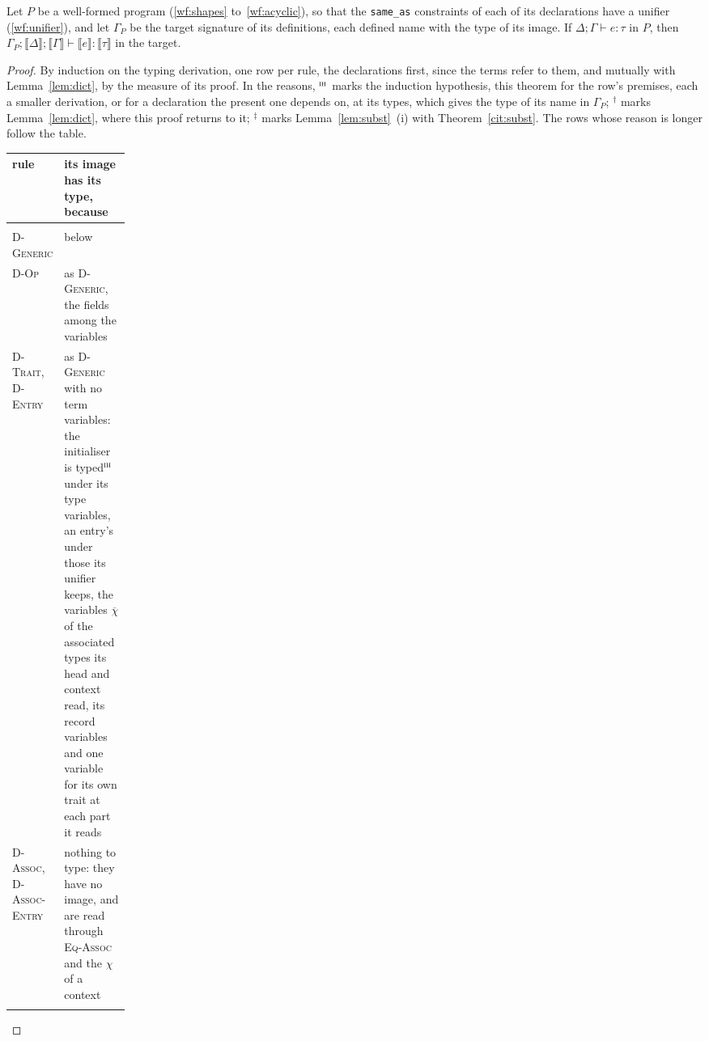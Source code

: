 \begin{theorem}
\label{thm:preservation}
Let $P$ be a well-formed program (\ref{wf:shapes} to~\ref{wf:acyclic}), so that the \texttt{same\_as} constraints of each of its declarations have a unifier (\ref{wf:unifier}), and let $\Gamma_P$ be the target signature of its definitions, each defined name with the type of its image.
If $\Delta; \Gamma \vdash e : \tau$ in $P$, then $\Gamma_P; \llbracket \Delta \rrbracket; \llbracket \Gamma \rrbracket \vdash \llbracket e \rrbracket : \llbracket \tau \rrbracket$ in the target.
\end{theorem}
\begin{proof}
By induction on the typing derivation, one row per rule, the declarations first, since the terms refer to them, and mutually with Lemma~\ref{lem:dict}, by the measure of its proof.
In the reasons, ${}^{\textsc{ih}}$ marks the induction hypothesis, this theorem for the row's premises, each a smaller derivation, or for a declaration the present one depends on, at its types, which gives the type of its name in $\Gamma_P$; ${}^{\dagger}$ marks Lemma~\ref{lem:dict}, where this proof returns to it; ${}^{\ddagger}$ marks Lemma~\ref{lem:subst}~(i) with Theorem~\ref{cit:subst}.
The rows whose reason is longer follow the table.
\begingroup
\small
\begin{longtable}{@{}>{\raggedright\arraybackslash}p{0.17\linewidth}>{\raggedright\arraybackslash}p{}@{}}
\toprule
rule & its image has its type, because \\
\midrule
\endhead
\bottomrule
\endlastfoot
\multicolumn{2}{@{}l}{\textit{declarations, Figures~\ref{fig:fjlt-assoc} and~\ref{fig:fjlt-declarations}}} \\
\textsc{D-Generic} & below \\
\textsc{D-Op} & as \textsc{D-Generic}, the fields among the variables \\
\textsc{D-Trait}, \textsc{D-Entry} & as \textsc{D-Generic} with no term variables: the initialiser is typed${}^{\textsc{ih}}$ under its type variables, an entry's under those its unifier keeps, the variables $\overline{\chi}$ of the associated types its head and context read, its record variables and one variable for its own trait at each part it reads \\
\textsc{D-Assoc}, \textsc{D-Assoc-Entry} & nothing to type: they have no image, and are read through \textsc{Eq-Assoc} and the $\chi$ of a context \\
\multicolumn{2}{@{}l}{\textit{terms, Figures~\ref{fig:fjlt-typing} to~\ref{fig:fjlt-declarations}}} \\

\end{longtable}
\end{proof}
